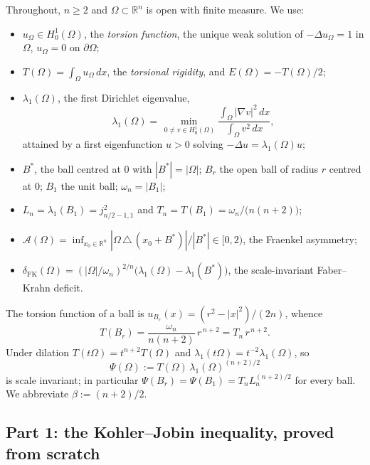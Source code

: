 \documentclass[11pt]{amsart}
\theoremstyle{definition}
\newcommand{\R}{\mathbb R}
\newcommand{\Om}{\Omega}
\newcommand{\Fr}{\mathcal A}
\newcommand{\abs}[1]{\left|#1\right|}
\newcommand{\dx}{\,dx}
\begin{document}
Throughout, $n\ge 2$ and $\Om\subset\R^n$ is open with finite measure. We
use:
\begin{itemize}
\item $u_\Om\in H^1_0(\Om)$, the \emph{torsion function}, the unique weak
solution of $-\Delta u_\Om=1$ in $\Om$, $u_\Om=0$ on $\partial\Om$;
\item $T(\Om)=\int_\Om u_\Om\dx$, the \emph{torsional rigidity}, and
$E(\Om)=-T(\Om)/2$;
\item $\lambda_1(\Om)$, the first Dirichlet eigenvalue,
\begin{equation}\label{eq:rayleigh}
  \lambda_1(\Om)=\min_{\,0\ne v\in H^1_0(\Om)}
  \frac{\int_\Om\abs{\nabla v}^2\dx}{\int_\Om v^2\dx},
\end{equation}
attained by a first eigenfunction $u>0$ solving $-\Delta u=\lambda_1(\Om)u$;
\item $B^*$, the ball centred at $0$ with $\abs{B^*}=\abs\Om$; $B_r$ the
open ball of radius $r$ centred at $0$; $B_1$ the unit ball;
$\omega_n=\abs{B_1}$;
\item $L_n=\lambda_1(B_1)=j_{n/2-1,1}^2$ and
$T_n=T(B_1)=\omega_n/\bigl(n(n+2)\bigr)$;
\item $\Fr(\Om)=\inf_{x_0\in\R^n}\abs{\Om\,\triangle\,(x_0+B^*)}/\abs{B^*}
\in[0,2)$, the Fraenkel asymmetry;
\item $\delta_{\mathrm{FK}}(\Om)
=(\abs\Om/\omega_n)^{2/n}\bigl(\lambda_1(\Om)-\lambda_1(B^*)\bigr)$, the
scale-invariant Faber--Krahn deficit.
\end{itemize}

The torsion function of a ball is $u_{B_r}(x)=(r^2-\abs x^2)/(2n)$, whence
\begin{equation}\label{eq:torsionball}
  T(B_r)=\frac{\omega_n}{n(n+2)}\,r^{\,n+2}=T_n\,r^{\,n+2}.
\end{equation}
Under dilation $T(t\Om)=t^{n+2}T(\Om)$ and $\lambda_1(t\Om)=t^{-2}\lambda_1(\Om)$,
so
\begin{equation}\label{eq:psi-def}
  \Psi(\Om):=T(\Om)\,\lambda_1(\Om)^{(n+2)/2}
\end{equation}
is scale invariant; in particular $\Psi(B_r)=\Psi(B_1)=T_n L_n^{(n+2)/2}$
for every ball. We abbreviate $\beta:=(n+2)/2$.

\subsection{Part 1: the Kohler--Jobin inequality, proved from scratch}
\label{ssec:kj-proof}
\end{document}
